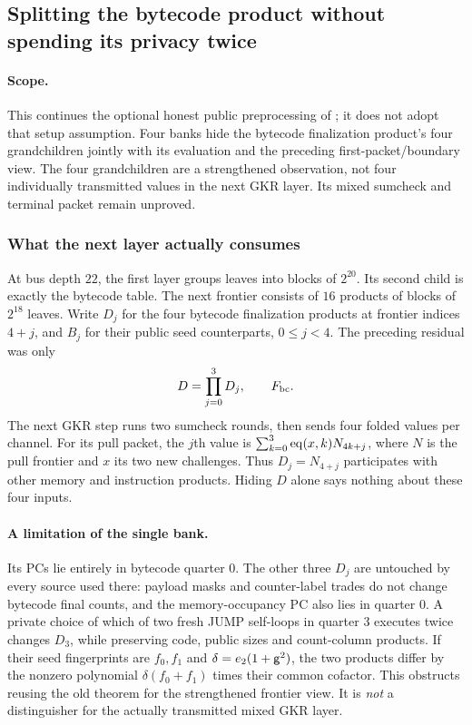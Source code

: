 \subsection{Splitting the bytecode product without spending its privacy twice}\label{note:zk-bytecode-frontier}

\paragraph{Scope.} This continues the optional honest public preprocessing of ; it does not adopt that setup assumption. Four banks hide the bytecode finalization product's four grandchildren jointly with its evaluation and the preceding first-packet/boundary view. The four grandchildren are a strengthened observation, not four individually transmitted values in the next GKR layer. Its mixed sumcheck and terminal packet remain unproved.

\subsubsection{What the next layer actually consumes}

At bus depth $22$, the first layer groups leaves into blocks of $2^{20}$. Its second child is exactly the bytecode table. The next frontier consists of $16$ products of blocks of $2^{18}$ leaves. Write $D_j$ for the four bytecode finalization products at frontier indices $4+j$, and $B_j$ for their public seed counterparts, $0\le j<4$. The preceding residual was only
\[
 D=\prod_{j=0}^3D_j,\qquad F_{\rm bc}.
\]
The next GKR step runs two sumcheck rounds, then sends four folded values per channel. For its pull packet, the $j$th value is $\sum_{k=0}^3\operatorname{eq}(x,k)N_{4k+j}$, where $N$ is the pull frontier and $x$ its two new challenges. Thus $D_j=N_{4+j}$ participates with other memory and instruction products. Hiding $D$ alone says nothing about these four inputs.

\paragraph{A limitation of the single bank.} Its PCs lie entirely in bytecode quarter $0$. The other three $D_j$ are untouched by every source used there: payload masks and counter-label trades do not change bytecode final counts, and the memory-occupancy PC also lies in quarter $0$. A private choice of which of two fresh JUMP self-loops in quarter $3$ executes twice changes $D_3$, while preserving code, public sizes and count-column products. If their seed fingerprints are $f_0,f_1$ and $\delta=e_2(1+\mathsf{g}^2)$, the two products differ by the nonzero polynomial $\delta(f_0+f_1)$ times their common cofactor. This obstructs reusing the old theorem for the strengthened frontier view. It is \emph{not} a distinguisher for the actually transmitted mixed GKR layer.

